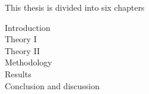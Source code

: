 This thesis is divided into six chapters
\begin{description}
\item[Introduction]
\item[Theory I]
\item[Theory II]
\item[Methodology]
\item[Results]
\item[Conclusion and discussion]
\end{description}

 \\
 \\
 \\
 \\
